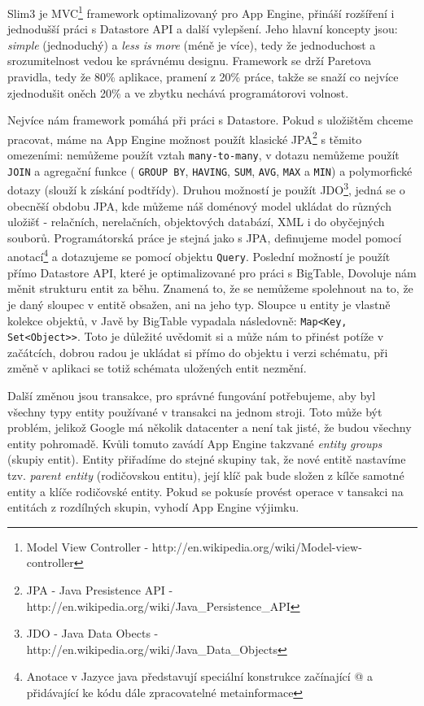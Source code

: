 Slim3 je MVC\footnote{Model View Controller - http://en.wikipedia.org/wiki/Model-view-controller}
framework optimalizovaný pro App Engine, přináší rozšíření i jednodušší práci s Datastore API a další vylepšení. Jeho hlavní koncepty jsou: \emph{simple} (jednoduchý) a \emph{less is more} (méně je více), tedy že jednoduchost a srozumitelnost vedou ke správnému designu. Framework se drží Paretova pravidla, tedy že 80\% aplikace, pramení z 20\% práce, takže se snaží co nejvíce zjednodušit oněch 20\% a ve zbytku nechává programátorovi volnost.

Nejvíce nám framework pomáhá při práci s Datastore. Pokud s uložištěm chceme pracovat, máme na App Engine možnost použít klasické JPA\footnote{JPA - Java Presistence API - http://en.wikipedia.org/wiki/Java\_Persistence\_API} s těmito omezeními: nemůžeme použít vztah \verb|many-to-many|, v dotazu nemůžeme použít \verb|JOIN| a agregační funkce ( \verb|GROUP BY|,  \verb|HAVING|,  \verb|SUM|,  \verb|AVG|,  \verb|MAX| a  \verb|MIN|) a polymorfické dotazy (slouží k získání podtřídy). Druhou možností je použít JDO\footnote{JDO - Java Data Obects - http://en.wikipedia.org/wiki/Java\_Data\_Objects}, jedná se o obecněší obdobu JPA, kde můžeme náš doménový model ukládat do různých uložišť - relačních, nerelačních, objektových databází,  XML i do obyčejných souborů. Programátorská práce je stejná jako s JPA, definujeme model pomocí anotací\footnote{Anotace v Jazyce java představují speciální konstrukce začínající @ a přidávající ke kódu dále zpracovatelné metainformace} a dotazujeme se pomocí objektu \verb|Query|. Poslední možností je použít přímo Datastore API, které je optimalizované pro práci s BigTable, Dovoluje nám měnit strukturu entit za běhu. Znamená to, že se nemůžeme spolehnout na to, že je daný sloupec v entitě obsažen, ani na jeho typ. Sloupce u entity je vlastně kolekce objektů, v Javě by BigTable vypadala následovně: \verb|Map<Key, Set<Object>>|. Toto je důležité uvědomit si a může nám to přinést potíže v začátcích, dobrou radou je ukládat si přímo do objektu i verzi schématu, při změně v aplikaci se totiž schémata uložených entit nezmění. 

Další změnou jsou transakce, pro správné fungování potřebujeme, aby byl všechny typy entity používané v transakci na jednom stroji. Toto může být problém, jelikož Google má několik datacenter a není tak jisté, že budou všechny entity pohromadě. Kvůli tomuto zavádí App Engine takzvané \emph{entity groups} (skupiy entit). Entity přiřadíme do stejné skupiny tak, že nové entitě nastavíme tzv. \emph{parent entity} (rodičovskou entitu), její klíč pak bude složen z kílče samotné entity a klíče rodičovské entity. Pokud se pokusíe provést operace v tansakci na entitách z rozdílných skupin, vyhodí App Engine výjimku.
